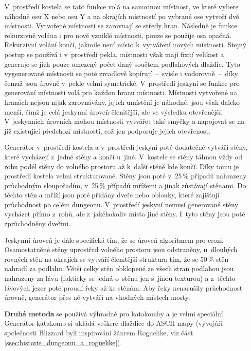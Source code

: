 V~prostředí kostela se tato funkce volá na samotnou místnost, ve které vybere náhodně osu X nebo osu Y a na okrajích místností po vybrané ose vytvoří dvě místnosti.
Vytvořené místnosti se zarovnají se středy hran.
Následně je funkce rekurzivně volána i pro nově vzniklé místnosti, pouze se použije osa opačná.
Rekurzivní volání končí, jakmile není místo k~vytváření nových místností.
Stejný postup se používá i v~prostředí pekla, místnosti však mají fixní velikost a generuje se jich pouze omezený počet daný součtem podlahových dlaždic.
Tyto vygenerované místnosti se poté zrcadlově kopírují~--~svisle i vodorovně~--~díky čemuž jsou úrovně v~pekle velmi symetrické.
V~prostředí jeskyní se funkce pro generování místností volá pro každou hranu místnosti.
Místnosti vytvořené na hranách nejsou nijak zarovnávány, jejich umístění je náhodné, jsou však daleko menší, čímž je celá jeskynní úroveň členitější, ale ve výsledku otevřenější.
V~jeskynních úrovních mohou místnosti vytvářet také smyčky a napojovat se na již existující předchozí místnosti, což jen podporuje jejich otevřenost.
\par
Generátor v~prostředí kostela a v~prostředí jeskyní poté dodatečně vytváří stěny, které vycházejí z~jedné stěny a končí u~jiné.
V~kostele se stěny táhnou vždy od rohu podél stěny do volného prostoru až k~další stěně kde končí.
Díky tomu je prostředí kostela velmi strukturované.
Stěny jsou poté v~25\,\% případů nahrazeny průchodným sloupořadím, v~25\,\% případů mřížemi a jinak zůstávají stěnami.
Do těchto stěn a mříží jsou poté přidány dveře nebo oblouky, které zajišťují průchodnost po celém dungeonu.
V~prostředí jeskyní nemusí generované stěny vycházet přímo z~rohů, ale z~jakéhokoliv místa jiné stěny.
I~tyto stěny jsou poté zprůchodněny dveřmi.
\par
Jeskynní úroveň je dále specifická tím, že se úroveň  algoritmem pro erozi.
Osamostatněné stěny uprostřed volného prostoru jsou odstraněny, u~dlouhých rovných stěn na okrajích se vytváří členitější struktura tím, že se 50\,\% stěn nahradí za podlahu.
Větší celky stěn obklopené ze všech stran podlahou jsou nahrazeny za lávu (fakticky se jedná o~stěnu jen s~jinou texturou) a z~těchto lávových jezer poté proudí řeky až ke stěnám.
Aby řeky nenarušily průchodnost úrovně, generátor přes ně vytváří na vhodných místech mosty.
\par
\textbf{Druhá metoda} se používá výhradně pro katakomby a je velmi speciální.
Generátor katakomb si ukládá veškeré dlaždice do ASCII mapy (vývojáři společnosti Blizzard byli inspirování žánrem Roguelike, viz část \ref{ssec:historie_dungeonu_a_roguelike}).
